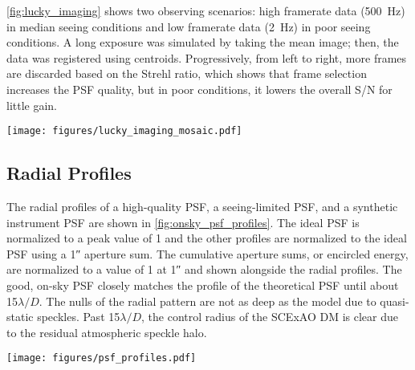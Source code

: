 \autoref{fig:lucky_imaging} shows two observing scenarios: high framerate data (\SI{500}{\hertz}) in median seeing conditions and low framerate data (\SI{2}{\hertz}) in poor seeing conditions. A long exposure was simulated by taking the mean image; then, the data was registered using centroids. Progressively, from left to right, more frames are discarded based on the Strehl ratio, which shows that frame selection increases the PSF quality, but in poor conditions, it lowers the overall S/N for little gain.

\begin{figure*}
    \centering
    \texttt{[image: figures/lucky\_imaging\_mosaic.pdf]}
    \caption{Post-processing data with lucky imaging. Each frame is shown with a log stretch and separate limits. (Top) high-framerate (\SI{500}{\hertz}) data in median seeing conditions. (Bottom) low-framerate (\SI{2}{\hertz}) data in mediocre seeing conditions. (Long Exp.) a mean combination without alignment, simulating a long exposure. (Shift-and-add) co-registering each frame before collapsing. (Discarding X\%) same as shift-and-add but discarding a percentage of data based on the Strehl ratio.\label{fig:lucky_imaging}}
\end{figure*}

\subsection{Radial Profiles}
The radial profiles of a high-quality PSF, a seeing-limited PSF, and a synthetic instrument PSF are shown in \autoref{fig:onsky_psf_profiles}. The ideal PSF is normalized to a peak value of 1 and the other profiles are normalized to the ideal PSF using a \ang{;;1} aperture sum. The cumulative aperture sums, or encircled energy, are normalized to a value of 1 at \ang{;;1} and shown alongside the radial profiles. The good, on-sky PSF closely matches the profile of the theoretical PSF until about 15$\lambda/D$. The nulls of the radial pattern are not as deep as the model due to quasi-static speckles. Past 15$\lambda/D$, the control radius of the SCExAO DM is clear due to the residual atmospheric speckle halo.

\begin{figure*}
    \centering
    \texttt{[image: figures/psf\_profiles.pdf]}
    \caption{Radial profiles and encircled energy in different observing scenarios. (Left) radial profiles normalized to an ideal PSF (gray), a high-quality on-sky PSF (the same as \autoref{fig:onsky_psf}, solid red), a poor-quality on-sky PSF (the same as \autoref{fig:bad_psfs}, dashed red), and an on-sky coronagraphic PSF with the \SI{59}{\mas} IWA (solid blue). The $1\sigma$ raw contrast curves are shown for the good PSF (dotted red) and the coronagraphic PSF (dotted blue). The control radius of the SCExAO DM is marked with a vertical gray line. (Right) the encircled energy normalized to an ideal PSF with a max radius of \ang{;;1} (gray), a good on-sky PSF (solid red), and a poor-quality PSF (dashed red). The control radius of the SCExAO DM is marked with a vertical gray line.\label{fig:onsky_psf_profiles}}
\end{figure*}


